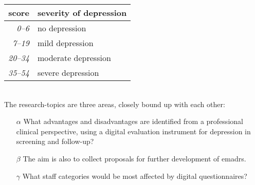 \documentclass[12pt,a4paper,oneside]{article}
\begin{document}
\begin{tabular}{r|l}
{\bf score} & {\bf severity of depression}\\
\hline{\it 0--6} &  no depression\\
{\it 7--19} & mild depression\\
{\it 20--34} & moderate depression\\
{\it 35--54} & severe depression\\
\end{tabular}\vspace{1em}
\\The research-topics are three areas, closely bound up with each other:
\begin{itemize}
\item[$\alpha$] What advantages and disadvantages are identified from a professional clinical perspective, using a digital evaluation instrument for depression in screening and follow-up?
\item[$\beta$] The aim is also to collect proposals for further development of e{\sc madrs}.
\item[$\gamma$] What staff categories would be most affected by digital questionnaires?
\end{itemize}
\end{document}
